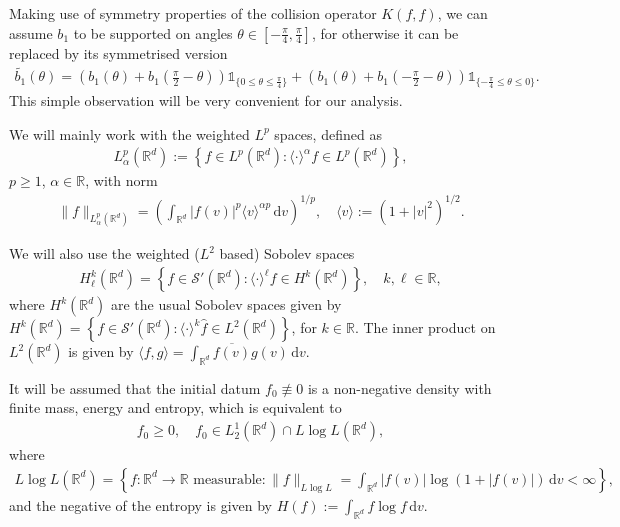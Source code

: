 \documentclass[11pt,a4paper,reqno]{amsart}
\theoremstyle{plain}
\theoremstyle{definition}
\begin{document}
Making use of symmetry properties of the collision operator $K(f,f)$, we can assume $b_1$ to be supported on angles $\theta\in[ -\frac{\pi}{4}, \frac{\pi}{4}]$, for otherwise it can be replaced by its symmetrised version
\begin{align*}
	\widetilde{b_1}(\theta) = \left( b_1(\theta) + b_1(\tfrac{\pi}{2}-\theta) \right) {\mathds{1}}_{\{0\leq \theta \leq \frac{\pi}{4}\}} + \left( b_1(\theta) + b_1(-\tfrac{\pi}{2}-\theta) \right) {\mathds{1}}_{\{-\frac{\pi}{4}\leq \theta \leq 0\}}.
\end{align*}
This simple observation will be very convenient for our analysis.

We will mainly work with the weighted $L^p$ spaces, defined as
\begin{align*}
	L^p_{\alpha}({\mathbb{R}}^d) := \left\{ f\in L^p({\mathbb{R}}^d): \langle \cdot \rangle^{\alpha} f \in L^p({\mathbb{R}}^d) \right\},
\end{align*}
$p\geq 1$, $\alpha \in {\mathbb{R}}$, with norm
\begin{align*}
	\| f\|_{L^p_{\alpha}({\mathbb{R}}^d)} = \left( \int_{{\mathbb{R}}^d} |f(v)|^p \langle v \rangle^{\alpha p} \,\mathrm{d}v \right)^{1/p}, \quad \langle v \rangle := (1+ |v|^2)^{1/2}.
\end{align*}

We will also use the weighted ($L^2$ based) Sobolev spaces
\begin{align*}
	H^k_{\ell}({\mathbb{R}}^d) = \left\{ f\in \mathcal{S}'({\mathbb{R}}^d): \langle \cdot \rangle^{\ell} f \in H^k({\mathbb{R}}^d) \right\}, \quad k,\ell \in {\mathbb{R}},
\end{align*}
where $H^k({\mathbb{R}}^d)$ are the usual Sobolev spaces
  given by 	$H^k ({\mathbb{R}}^d) = \left\{ f\in \mathcal{S}'({\mathbb{R}}^d): \langle \cdot \rangle^{k} \hat{f} \in L^2({\mathbb{R}}^d) \right\}$, for $k  \in {\mathbb{R}}$.
The inner product on $L^2({\mathbb{R}}^d)$ is given by $\langle f,g\rangle = \int_{{\mathbb{R}}^d} \overline{f(v)} g(v) \,\mathrm{d}v$.

It will be assumed that the initial datum $f_0\not\equiv 0$ is a non-negative density with finite mass, energy and entropy, which is equivalent to
\begin{align}\label{eq:initialdata}
	f_0\geq 0, \quad f_0\in L^1_2({\mathbb{R}}^d)\cap L\log L({\mathbb{R}}^d),
\end{align}
where
\begin{align*}
	L\log L({\mathbb{R}}^d) = \left\{f:{\mathbb{R}}^d\to{\mathbb{R}} \text{ measurable}: \|f\|_{L\log L} = \int_{{\mathbb{R}}^d} |f(v)| \log\left(1+|f(v)|\right)\,\mathrm{d}v < \infty\right\},
\end{align*}
and the negative of the entropy is given by $H(f):=\int_{{\mathbb{R}}^d} f\log f\, \mathrm{d}v$.
\end{document}
